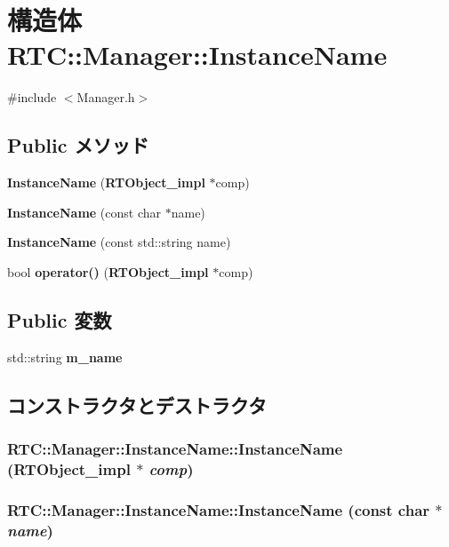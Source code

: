 \section{構造体 RTC::Manager::InstanceName}
\label{structRTC_1_1Manager_1_1InstanceName}


{\ttfamily \#include $<$Manager.h$>$}

\subsection*{Public メソッド}
\begin{DoxyCompactItemize}
\item 
{\bf InstanceName} ({\bf RTObject\_\-impl} $\ast$comp)
\item 
{\bf InstanceName} (const char $\ast$name)
\item 
{\bf InstanceName} (const std::string name)
\item 
bool {\bf operator()} ({\bf RTObject\_\-impl} $\ast$comp)
\end{DoxyCompactItemize}
\subsection*{Public 変数}
\begin{DoxyCompactItemize}
\item 
std::string {\bf m\_\-name}
\end{DoxyCompactItemize}


\subsection{コンストラクタとデストラクタ}
\subsubsection[{InstanceName}]{\setlength{\rightskip}{0pt plus 5cm}RTC::Manager::InstanceName::InstanceName ({\bf RTObject\_\-impl} $\ast$ {\em comp})}\label{structRTC_1_1Manager_1_1InstanceName_a79521954523289d88f986d78abf73939}
\subsubsection[{InstanceName}]{\setlength{\rightskip}{0pt plus 5cm}RTC::Manager::InstanceName::InstanceName (const char $\ast$ {\em name})}\label{structRTC_1_1Manager_1_1InstanceName_a7317d4881eff0b19d18f918c2252ba44}

